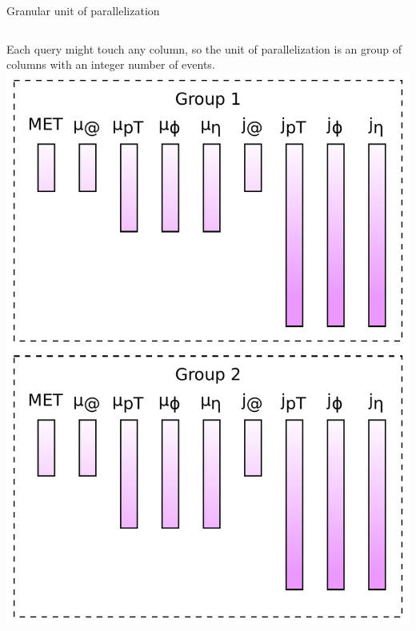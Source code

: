 \documentclass{beamer}
\begin{document}
\begin{frame}{Granular unit of parallelization}
\vspace{0.5 cm}
\begin{columns}
\large
Each query might touch any column, so the unit of parallelization is an group of columns with an integer number of events.
\includegraphics[width=\linewidth]{groups.pdf}
\end{columns}
\end{frame}
\end{document}
